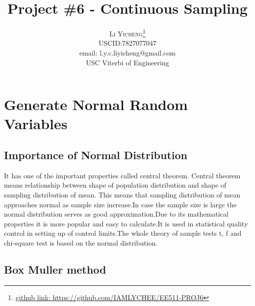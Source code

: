 \documentclass[twoside]{article}
\title{\vspace{-15mm}\fontsize{24pt}{10pt}\selectfont\textbf{Project \#6 - Continuous Sampling }} %
\author{
\large
\textsc{Li Yicheng}\thanks{\href{https://github.com/IAMLYCHEE/EE511}{github link: https://github.com/IAMLYCHEE/EE511-PROJ6} }\\[2mm] %
\normalsize USCID:7827077047\\
\normalsize email: l.y.c.liyicheng@gmail.com \\ %
\normalsize USC Viterbi of Engineering
\vspace{-5mm}
}
\date{}
\begin{document}
\maketitle %

\thispagestyle{fancy} %
\section{Generate Normal Random Variables}
\begin{multicols*}{2}
\subsection{\normalsize{Importance of Normal Distribution}}
 It has one of the important properties called central theorem. Central theorem means relationship between shape of population distribution and shape of sampling distribution of mean. This means that sampling distribution of mean approaches normal as sample size increase.In case the sample size is large the normal distribution serves as good approximation.Due to its mathematical properties it is more popular and easy to calculate.It is used in statistical quality control in setting up of control limits.The whole theory of sample tests t, f and chi-square test is based on the normal distribution.\\
\subsection{\normalsize{Box Muller method}}

\end{multicols*}
\end{document}
